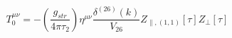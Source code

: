 \begin{equation}
T^{\mu\nu}_0=-\left(\frac{g_{str}}{4\pi \tau_2}\right)\eta^{\mu\nu}
\frac{ \delta^{(26)}(k)}{V_{26}}Z_{\parallel,(1,1)}[\tau]Z_\perp[\tau]
\end{equation}

